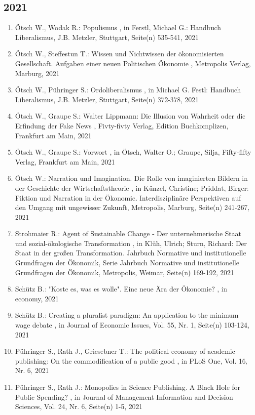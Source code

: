  \subsection*{2021} 
 \begin{enumerate}[leftmargin=*, labelsep=0.5cm] 
	 \item Ötsch W., Wodak R.:  Populismus  , in Ferstl, Michael G.: Handbuch Liberalismus, J.B. Metzler, Stuttgart, Seite(n) 535-541, 2021
	 \item Ötsch W., Steffestun T.:  Wissen und Nichtwissen der ökonomisierten Gesellschaft. Aufgaben einer neuen Politischen Ökonomie  , Metropolis Verlag, Marburg, 2021
	 \item Ötsch W., Pühringer S.:  Ordoliberalismus  , in Michael G. Festl: Handbuch Liberalismus, J.B. Metzler, Stuttgart, Seite(n) 372-378, 2021
	 \item Ötsch W., Graupe S.:  Walter Lippmann: Die Illusion von Wahrheit oder die Erfindung der Fake News  , Fivty-fivty Verlag, Edition Buchkomplizen, Frankfurt am Main, 2021
	 \item Ötsch W., Graupe S.:  Vorwort  , in Ötsch, Walter O.; Graupe, Silja, Fifty-fifty Verlag, Frankfurt am Main, 2021
	 \item Ötsch W.:  Narration und Imagination. Die Rolle von imaginierten Bildern in der Geschichte der Wirtschaftstheorie  , in Künzel, Christine; Priddat, Birger: Fiktion und Narration in der Ökonomie. Interdisziplinäre Perspektiven auf den Umgang mit ungewisser Zukunft, Metropolis, Marburg, Seite(n) 241-267, 2021
	 \item Strohmaier R.:  Agent of Sustainable Change - Der unternehmerische Staat und sozial-ökologische Transformation  , in Klüh, Ulrich; Sturn, Richard: Der Staat in der großen Transformation. Jahrbuch Normative und institutionelle Grundfragen der Ökonomik, Serie Jahrbuch Normative und institutionelle Grundfragen der Ökonomik, Metropolis, Weimar, Seite(n) 169-192, 2021
	 \item Schütz B.:  "Koste es, was es wolle". Eine neue Ära der Ökonomie?  , in economy, 2021
	 \item Schütz B.:  Creating a pluralist paradigm: An application to the minimum wage debate  , in Journal of Economic Issues, Vol. 55, Nr. 1, Seite(n) 103-124, 2021
	 \item Pühringer S., Rath J., Griesebner T.:  The political economy of academic publishing: On the commodification of a public good  , in PLoS One, Vol. 16, Nr. 6, 2021
	 \item Pühringer S., Rath J.:  Monopolies in Science Publishing. A Black Hole for Public Spending?  , in Journal of Management Information and Decision Sciences, Vol. 24, Nr. 6, Seite(n) 1-5, 2021

\end{enumerate}
